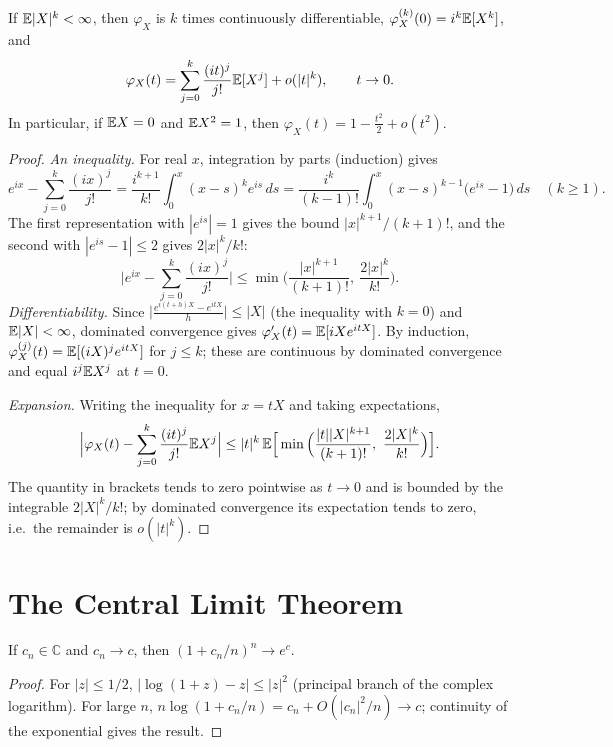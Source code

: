 \documentclass[main.tex]{subfiles}
\begin{document}
\begin{proposition}\label{prop:kf-taylor}
If $\mathbb{E}|X|^k<\infty$, then $\varphi_X$ is $k$ times continuously differentiable, $\varphi_X^{(k)}(0)=i^k\mathbb{E}[X^k]$, and
\[
\varphi_X(t)=\sum_{j=0}^k\frac{(it)^j}{j!}\mathbb{E}[X^j]+o(|t|^k),\qquad t\to0 .
\]
In particular, if $\mathbb{E} X=0$ and $\mathbb{E} X^2=1$, then $\varphi_X(t)=1-\frac{t^2}{2}+o(t^2)$.
\end{proposition}
\begin{proof}
\emph{An inequality.} For real $x$, integration by parts (induction) gives
\[
e^{ix}-\sum_{j=0}^k\frac{(ix)^j}{j!}=\frac{i^{k+1}}{k!}\int_0^x(x-s)^ke^{is}\,ds
=\frac{i^{k}}{(k-1)!}\int_0^x(x-s)^{k-1}\big(e^{is}-1\big)\,ds\quad(k\ge1).
\]
The first representation with $|e^{is}|=1$ gives the bound $|x|^{k+1}/(k+1)!$, and the second with $|e^{is}-1|\le2$ gives $2|x|^k/k!$:
\[
\Big|e^{ix}-\sum_{j=0}^k\frac{(ix)^j}{j!}\Big|\le\min\Big(\frac{|x|^{k+1}}{(k+1)!},\ \frac{2|x|^k}{k!}\Big).
\]
\emph{Differentiability.} Since $\big|\frac{e^{i(t+h)X}-e^{itX}}{h}\big|\le|X|$ (the inequality with $k=0$) and $\mathbb{E}|X|<\infty$, dominated convergence gives $\varphi_X'(t)=\mathbb{E}[iXe^{itX}]$. By induction, $\varphi_X^{(j)}(t)=\mathbb{E}[(iX)^je^{itX}]$ for $j\le k$; these are continuous by dominated convergence and equal $i^j\mathbb{E} X^j$ at $t=0$.

\emph{Expansion.} Writing the inequality for $x=tX$ and taking expectations,
\[
\Big|\varphi_X(t)-\sum_{j=0}^k\frac{(it)^j}{j!}\E X^j\Big|\le|t|^k\,\E\Big[\min\Big(\frac{|t||X|^{k+1}}{(k+1)!},\ \frac{2|X|^k}{k!}\Big)\Big].
\]
The quantity in brackets tends to zero pointwise as $t\to0$ and is bounded by the integrable $2|X|^k/k!$; by dominated convergence its expectation tends to zero, i.e.\ the remainder is $o(|t|^k)$.
\end{proof}

\section{The Central Limit Theorem}

\begin{lemma}\label{lem:karmasik-limit}
If $c_n\in\mathbb{C}$ and $c_n\to c$, then $(1+c_n/n)^n\to e^{c}$.
\end{lemma}
\begin{proof}
For $|z|\le1/2$, $|\log(1+z)-z|\le|z|^2$ (principal branch of the complex logarithm). For large $n$, $n\log(1+c_n/n)=c_n+O(|c_n|^2/n)\to c$; continuity of the exponential gives the result.
\end{proof}
\end{document}
